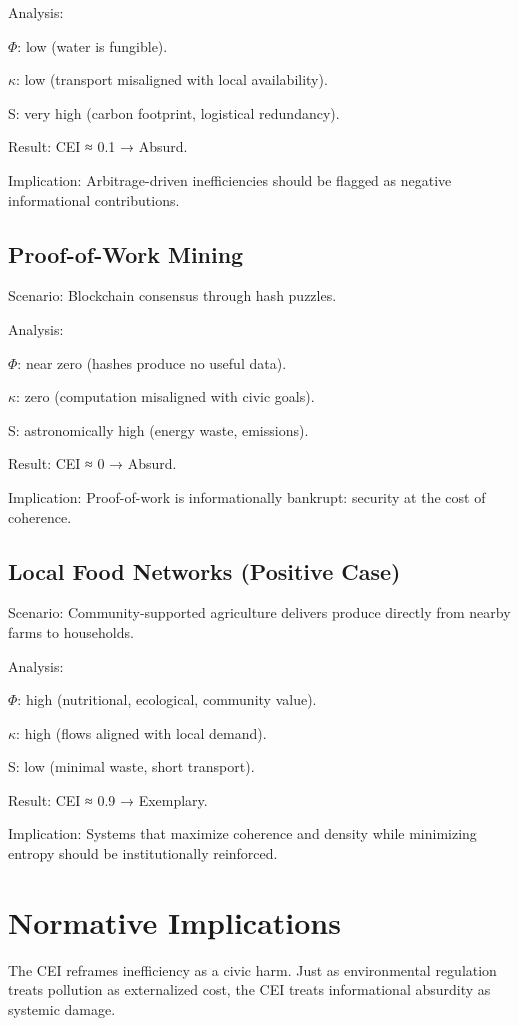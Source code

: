 \documentclass{book}
\begin{document}
Analysis:

\(\Phi\): low (water is fungible).

\(\kappa\): low (transport misaligned with local availability).

S: very high (carbon footprint, logistical redundancy).

Result: CEI ≈ 0.1 → Absurd.

Implication: Arbitrage-driven inefficiencies should be flagged as negative informational contributions.

\subsection{Proof-of-Work Mining}

Scenario: Blockchain consensus through hash puzzles.

Analysis:

\(\Phi\): near zero (hashes produce no useful data).

\(\kappa\): zero (computation misaligned with civic goals).

S: astronomically high (energy waste, emissions).

Result: CEI ≈ 0 → Absurd.

Implication: Proof-of-work is informationally bankrupt: security at the cost of coherence.

\subsection{Local Food Networks (Positive Case)}

Scenario: Community-supported agriculture delivers produce directly from nearby farms to households.

Analysis:

\(\Phi\): high (nutritional, ecological, community value).

\(\kappa\): high (flows aligned with local demand).

S: low (minimal waste, short transport).

Result: CEI ≈ 0.9 → Exemplary.

Implication: Systems that maximize coherence and density while minimizing entropy should be institutionally reinforced.

\section{Normative Implications}

The CEI reframes inefficiency as a civic harm. Just as environmental regulation treats pollution as externalized cost, the CEI treats informational absurdity as systemic damage.
\end{document}
